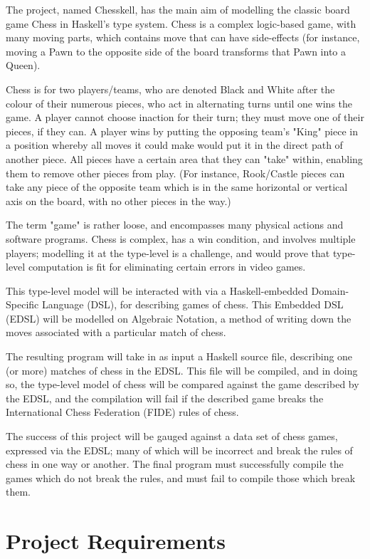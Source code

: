 \documentclass[12pt, a4paper]{scrartcl}
\begin{document}
The project, named Chesskell, has the main aim of modelling the classic board game Chess in Haskell's type system. Chess is a complex logic-based game, with many moving parts, which contains move that can have side-effects (for instance, moving a Pawn to the opposite side of the board transforms that Pawn into a Queen).

Chess is for two players/teams, who are denoted Black and White after the colour of their numerous pieces, who act in alternating turns until one wins the game. A player cannot choose inaction for their turn; they must move one of their pieces, if they can. A player wins by putting the opposing team's "King" piece in a position whereby all moves it could make would put it in the direct path of another piece. All pieces have a certain area that they can "take" within, enabling them to remove other pieces from play. (For instance, Rook/Castle pieces can take any piece of the opposite team which is in the same horizontal or vertical axis on the board, with no other pieces in the way.)

The term "game" is rather loose, and encompasses many physical actions and software programs. Chess is complex, has a win condition, and involves multiple players; modelling it at the type-level is a challenge, and would prove that type-level computation is fit for eliminating certain errors in video games.

This type-level model will be interacted with via a Haskell-embedded Domain-Specific Language (DSL), for describing games of chess. This Embedded DSL (EDSL) will be modelled on Algebraic Notation, a method of writing down the moves associated with a particular match of chess.

The resulting program will take in as input a Haskell source file, describing one (or more) matches of chess in the EDSL. This file will be compiled, and in doing so, the type-level model of chess will be compared against the game described by the EDSL, and the compilation will fail if the described game breaks the International Chess Federation (FIDE) rules of chess.

The success of this project will be gauged against a data set of chess games, expressed via the EDSL; many of which will be incorrect and break the rules of chess in one way or another. The final program must successfully compile the games which do not break the rules, and must fail to compile those which break them.

\section{Project Requirements}
\end{document}
